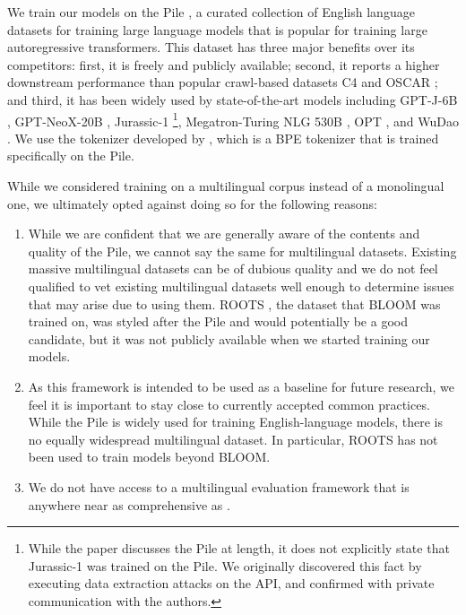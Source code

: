 We train our models on the Pile \citep{gao2020pile,biderman2022datasheet}, a curated collection of English language datasets for training large language models that is popular for training large autoregressive transformers. This dataset has three major benefits over its competitors: first, it is freely and publicly available; second, it reports a higher downstream performance \citep{le2022language} than popular crawl-based datasets C4 \citep{raffel2020exploring,dodge2021documenting} and OSCAR \citep{OSCAR}; and third, it has been widely used by state-of-the-art models including \mbox{GPT-J-6B} \citep{gpt-j}, \mbox{GPT-NeoX-20B} \citep{black2022gpt}, \mbox{Jurassic-1} \citep{lieber2021jurassic}\footnote{While the paper discusses the Pile at length, it does not explicitly state that Jurassic-1 was trained on the Pile. We originally discovered this fact by executing data extraction attacks on the API, and confirmed with private communication with the authors.}, Megatron-Turing NLG 530B \citep{Megatron-Turing}, OPT \citep{zhang2022opt}, and WuDao \citep{WuDao}. We use the tokenizer developed by \citet{black2022gpt}, which is a BPE tokenizer that is trained specifically on the Pile.

While we considered training on a multilingual corpus instead of a monolingual one, we ultimately opted against doing so for the following reasons:

\begin{enumerate}
    \item While we are confident that we are generally aware of the contents and quality of the Pile, we cannot say the same for multilingual datasets. Existing massive multilingual datasets can be of dubious quality \citep{caswell2020language,kreutzer2021quality} and we do not feel qualified to vet existing multilingual datasets well enough to determine issues that may arise due to using them. ROOTS \cite{laurencon2022roots}, the dataset that BLOOM \citep{scao2022bloom} was trained on, was styled after the Pile and would potentially be a good candidate, but it was not publicly available when we started training our models.
    \item As this framework is intended to be used as a baseline for future research, we feel it is important to stay close to currently accepted common practices. While the Pile is widely used for training English-language models, there is no equally widespread multilingual dataset. In particular, ROOTS has not been used to train models beyond BLOOM. 
    \item We do not have access to a multilingual evaluation framework that is anywhere near as comprehensive as \citet{gao2021eval}.
\end{enumerate}

